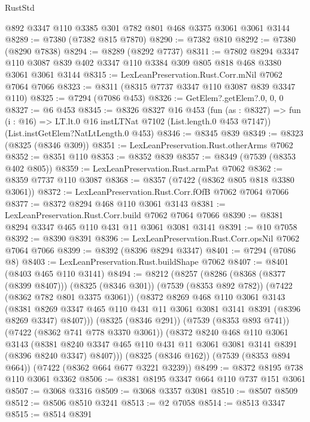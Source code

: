 \begin{lexlean}{RustStd}
\begin{coremodule}
    @892
    @3347
    @110
    @3385
    @301
    @782
    @801
    @468
    @3375
    @3061
    @3061
    @3144
@8289 := @7380 (@7382 @815 @7870)
@8290 := @7382 @810
@8292 := @7380 (@8290 @7838)
@8294 := @8289 (@8292 @7737)
@8311 := @7802
    @8294
    @3347
    @110
    @3087
    @839
    @402
    @3347
    @110
    @3384
    @309
    @805
    @818
    @468
    @3380
    @3061
    @3061
    @3144
@8315 := LexLeanPreservation.Rust.Corr.mNil @7062 @7064 @7066
@8323 := @8311 (@8315 @7737 @3347 @110 @3087 @839 @3347 @110)
@8325 := @7294 (@7086 @453)
@8326 := GetElem?.getElem?.{0, 0, 0}
@8327 := @6 @453
@8345 := @8326
    @8327
    @16
    @453
    (fun (as : @8327) =>
    fun (i : @16) => LT.lt.{0} @16 instLTNat @7102 (List.length.{0} @453 @7147))
    (List.instGetElem?NatLtLength.{0} @453)
@8346 := @8345 @839
@8349 := @8323 (@8325 (@8346 @309))
@8351 := LexLeanPreservation.Rust.otherArms @7062
@8352 := @8351 @110
@8353 := @8352 @839
@8357 := @8349 (@7539 (@8353 @402 @805))
@8359 := LexLeanPreservation.Rust.armPat @7062
@8362 := @8359 @7737 @110 @3087
@8368 := @8357 (@7422 (@8362 @805 @818 @3380 @3061))
@8372 := LexLeanPreservation.Rust.Corr.fOfB @7062 @7064 @7066
@8377 := @8372 @8294 @468 @110 @3061 @3143
@8381 := LexLeanPreservation.Rust.Corr.build @7062 @7064 @7066
@8390 := @8381 @8294 @3347 @465 @110 @431 @11 @3061 @3081 @3141
@8391 := @10 @7058
@8392 := @8390 @8391
@8396 := LexLeanPreservation.Rust.Corr.opsNil @7062 @7064 @7066
@8399 := @8392 (@8396 @8294 @3347)
@8401 := @7294 (@7086 @8)
@8403 := LexLeanPreservation.Rust.buildShape @7062
@8407 := @8401 (@8403 @465 @110 @3141)
@8494 := @8212
    (@8257
      (@8286
        (@8368 (@8377 (@8399 @8407)))
        (@8325 (@8346 @301))
        (@7539 (@8353 @892 @782))
        (@7422 (@8362 @782 @801 @3375 @3061))
        (@8372
          @8269
          @468
          @110
          @3061
          @3143
          (@8381 @8269 @3347 @465 @110 @431 @11 @3061 @3081 @3141 @8391 (@8396 @8269 @3347) @8407)))
      (@8325 (@8346 @291))
      (@7539 (@8353 @893 @741))
      (@7422 (@8362 @741 @778 @3370 @3061))
      (@8372
        @8240
        @468
        @110
        @3061
        @3143
        (@8381 @8240 @3347 @465 @110 @431 @11 @3061 @3081 @3141 @8391 (@8396 @8240 @3347) @8407)))
    (@8325 (@8346 @162))
    (@7539 (@8353 @894 @664))
    (@7422 (@8362 @664 @677 @3221 @3239))
@8499 := @8372 @8195 @738 @110 @3061 @3362
@8506 := @8381 @8195 @3347 @664 @110 @737 @151 @3061
@8507 := @3068 @3316
@8509 := @3068 @3357 @3081
@8510 := @8507 @8509
@8512 := @8506 @8510 @3241
@8513 := @2 @7058
@8514 := @8513 @3347
@8515 := @8514 @8391

\end{coremodule}
\end{lexlean}
